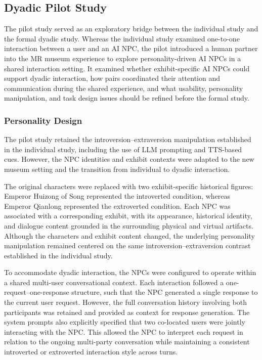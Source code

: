 \documentclass[a4paper,fleqn]{cas-sc}
\begin{document}
\subsection{Dyadic Pilot Study}

The pilot study served as an exploratory bridge between the individual study and the formal dyadic study. Whereas the individual study examined one-to-one interaction between a user and an AI NPC, the pilot introduced a human partner into the MR museum experience to explore personality-driven AI NPCs in a shared interaction setting. It examined whether exhibit-specific AI NPCs could support dyadic interaction, how pairs coordinated their attention and communication during the shared experience, and what usability, personality manipulation, and task design issues should be refined before the formal study.

\subsubsection{Personality Design}

The pilot study retained the introversion--extraversion manipulation established in the individual study, including the use of LLM prompting and TTS-based cues. However, the NPC identities and exhibit contexts were adapted to the new museum setting and the transition from individual to dyadic interaction.

The original characters were replaced with two exhibit-specific historical figures: Emperor Huizong of Song represented the introverted condition, whereas Emperor Qianlong represented the extroverted condition. Each NPC was associated with a corresponding exhibit, with its appearance, historical identity, and dialogue content grounded in the surrounding physical and virtual artifacts. Although the characters and exhibit content changed, the underlying personality manipulation remained centered on the same introversion--extraversion contrast established in the individual study.

To accommodate dyadic interaction, the NPCs were configured to operate within a shared multi-user conversational context. Each interaction followed a one-request--one-response structure, such that the NPC generated a single response to the current user request. However, the full conversation history involving both participants was retained and provided as context for response generation. The system prompts also explicitly specified that two co-located users were jointly interacting with the NPC. This allowed the NPC to interpret each request in relation to the ongoing multi-party conversation while maintaining a consistent introverted or extroverted interaction style across turns.
\end{document}
